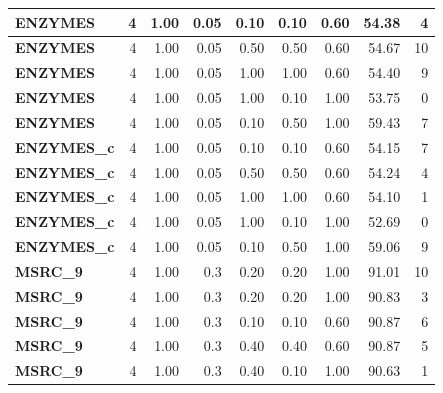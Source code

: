\begin{longtable}{|l||r|r|r|r|r|r||r|r|}
		\textbf{ENZYMES} & 4 & 1.00 & 0.05 & 0.10 & 0.10 & 0.60 & 54.38 & 4 \\ \hline
		\textbf{ENZYMES} & 4 & 1.00 & 0.05 & 0.50 & 0.50 & 0.60 & 54.67 & 10 \\ \hline
		\textbf{ENZYMES} & 4 & 1.00 & 0.05 & 1.00 & 1.00 & 0.60 & 54.40 & 9 \\ \hline
		\textbf{ENZYMES} & 4 & 1.00 & 0.05 & 1.00 & 0.10 & 1.00 & 53.75 & 0 \\ \hline
		\textbf{ENZYMES} & 4 & 1.00 & 0.05 & 0.10 & 0.50 & 1.00 & 59.43 & 7 \\ \hline
		\textbf{ENZYMES\_c} & 4 & 1.00 & 0.05 & 0.10 & 0.10 & 0.60 & 54.15 & 7 \\ \hline
		\textbf{ENZYMES\_c} & 4 & 1.00 & 0.05 & 0.50 & 0.50 & 0.60 & 54.24 & 4 \\ \hline
		\textbf{ENZYMES\_c} & 4 & 1.00 & 0.05 & 1.00 & 1.00 & 0.60 & 54.10 & 1 \\ \hline
		\textbf{ENZYMES\_c} & 4 & 1.00 & 0.05 & 1.00 & 0.10 & 1.00 & 52.69 & 0 \\ \hline
		\textbf{ENZYMES\_c} & 4 & 1.00 & 0.05 & 0.10 & 0.50 & 1.00 & 59.06 & 9 \\ \hline
		\textbf{MSRC\_9} & 4 & 1.00 & 0.3 & 0.20 & 0.20 & 1.00 & 91.01 & 10 \\ \hline
		\textbf{MSRC\_9} & 4 & 1.00 & 0.3 & 0.20 & 0.20 & 1.00 & 90.83 & 3 \\ \hline
		\textbf{MSRC\_9} & 4 & 1.00 & 0.3 & 0.10 & 0.10 & 0.60 & 90.87 & 6 \\ \hline
		\textbf{MSRC\_9} & 4 & 1.00 & 0.3 & 0.40 & 0.40 & 0.60 & 90.87 & 5 \\ \hline
		\textbf{MSRC\_9} & 4 & 1.00 & 0.3 & 0.40 & 0.10 & 1.00 & 90.63 & 1 \\ \hline

\end{longtable}
